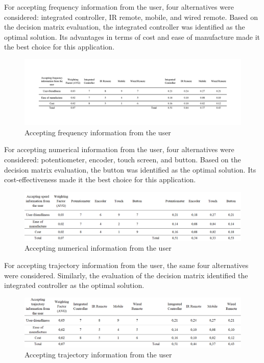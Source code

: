 \documentclass[12pt]{article}
\begin{document}
For accepting frequency information from the user, four alternatives were considered: integrated controller, IR remote, mobile, and wired remote. Based on the decision matrix evaluation, the integrated controller was identified as the optimal solution. Its advantages in terms of cost and ease of manufacture made it the best choice for this application.

\begin{figure}[H]
    \centering
    \includegraphics[width=1\textwidth]{Decision matrices/accept frequency.png}
    \caption{Accepting frequency information from the user}
\end{figure}

For accepting numerical information from the user, four alternatives were considered: potentiometer, encoder, touch screen, and button. Based on the decision matrix evaluation, the button was identified as the optimal solution. Its cost-effectiveness made it the best choice for this application.

\begin{figure}[H]
    \centering
    \includegraphics[width=1\textwidth]{Decision matrices/accept numerical.png}
    \caption{Accepting numerical information from the user}
\end{figure}

For accepting trajectory information from the user, the same four alternatives were considered. Similarly, the evaluation of the decision matrix identified the integrated controller as the optimal solution.

\begin{figure}[H]
    \centering
    \includegraphics[width=1\textwidth]{Decision matrices/accept traj.png}
    \caption{Accepting trajectory information from the user}
\end{figure}
\end{document}

